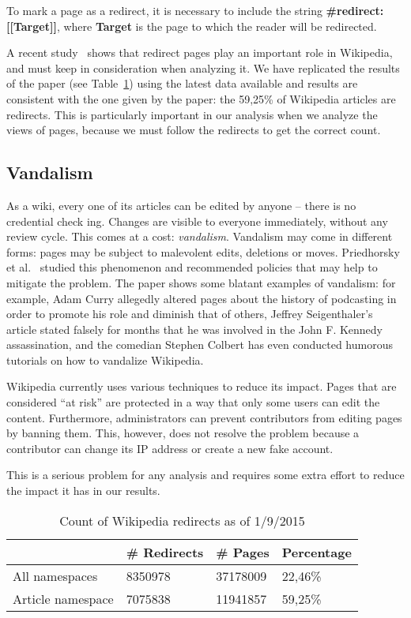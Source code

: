 To mark a page as a redirect, it is necessary to include the string \textbf{\#redirect: [[Target]]}, where \textbf{Target} is the page to which the reader will be redirected.

A recent study~\cite{Hill2014} shows that redirect pages play an important role in Wikipedia, and must keep in consideration when analyzing it.
We have replicated the results of the paper (see Table~\ref{tbl:redirects}) using the latest data available and results are consistent with the one given by the paper: the 59,25\% of Wikipedia articles are redirects.
This is particularly important in our analysis when we analyze the views of pages, because we must follow the redirects to get the correct count.

\subsection{Vandalism}
As a wiki, every one of its articles can be edited by anyone – there is no credential check ing.
Changes are visible to everyone immediately, without any review cycle.
This comes at a cost: \emph{vandalism}.
Vandalism may come in different forms: pages may be subject to malevolent edits, deletions or moves.
Priedhorsky et al.~\cite{Priedhorsky2007} studied this phenomenon and recommended policies that may help to mitigate the problem.
The paper shows some blatant examples of vandalism: for example, Adam Curry allegedly altered pages about the history of podcasting in order to promote his role and diminish that of others, Jeffrey Seigenthaler's article stated falsely for months that he was involved in the John F. Kennedy assassination, and the comedian Stephen Colbert has even conducted humorous tutorials on how to vandalize Wikipedia.

Wikipedia currently uses various techniques to reduce its impact.
Pages that are considered ``at risk'' are protected in a way that only some users can edit the content.
Furthermore, administrators can prevent contributors from editing pages by banning them.
This, however, does not resolve the problem because a contributor can change its IP address or create a new fake account.

This is a serious problem for any analysis and requires some extra effort to reduce the impact it has in our results.

\begin{table}[]
\centering
\caption{Count of Wikipedia redirects as of 1/9/2015}
\label{tbl:redirects}
\begin{tabular}{llll}
\multicolumn{1}{c}{\textbf{}}          & \multicolumn{1}{c}{\textbf{\# Redirects}} & \multicolumn{1}{c}{\textbf{\# Pages}} & \textbf{Percentage} \\ \hline
\multicolumn{1}{l|}{All namespaces}    & 8350978                                & 37178009                               & 22,46\%             \\
\multicolumn{1}{l|}{Article namespace} & 7075838                                & 11941857                               & 59,25\%
\end{tabular}
\end{table}




